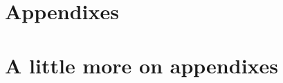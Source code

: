 \documentclass[%
 reprint,
 amsmath,amssymb,
 aps,
]{revtex4-2}
\begin{document}
\appendix

\section{Appendixes}



\section{A little more on appendixes}



\nocite{*}



 \label{paper1}%
\end{document}
